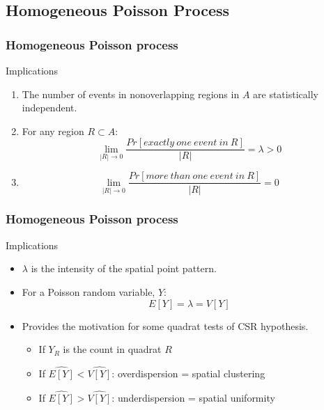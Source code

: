 \documentclass[nototal,handout]{beamer}
\begin{document}
\subsection{Homogeneous Poisson Process}
\begin{frame}[<+->]
  \frametitle{Homogeneous Poisson process}
  \begin{block}{Implications}
    \begin{enumerate}
      \item The number of events in nonoverlapping regions in $A$ are
	statistically independent.
      \item For any region $R \subset A$:
	\begin{equation}
	  \lim_{|R| \rightarrow 0} \frac{Pr[exactly\ one\ event\ in\ R]}{|R|}
	  = \lambda > 0
	\end{equation}
      \item \begin{equation}
	   \lim_{|R| \rightarrow 0} \frac{Pr[more\ than\ one\ event\ in\
	   R]}{|R|} = 0
	\end{equation}
    \end{enumerate}
   \end{block}
 \end{frame}

\begin{frame}[<+->]
  \frametitle{Homogeneous Poisson process}
  \begin{block}{Implications}
    \begin{itemize}
      \item $\lambda$ is the intensity of the spatial point pattern.
      \item For a Poisson random variable, $Y$:
	\begin{equation}
	  E[Y] = \lambda = V[Y]
	\end{equation}
      \item Provides the motivation for some quadrat tests of CSR hypothesis. 
	\begin{itemize}
	  \item If $Y_R$ is the count in quadrat $R$
	  \item If $\widehat{E[Y]}< \widehat{V[Y]}$: overdispersion = spatial clustering
	  \item If $\widehat{E[Y]}> \widehat{V[Y]}$: underdispersion = spatial uniformity
	\end{itemize}
    \end{itemize}
   \end{block}
 \end{frame}
\end{document}
